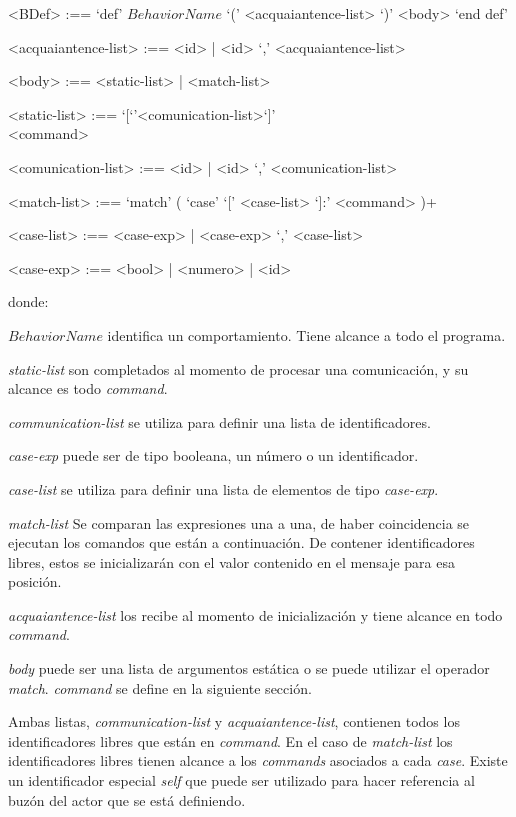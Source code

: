 \begin{grammar}
<BDef> :== `def' $BehaviorName$ `(' <acquaiantence-list> `)' <body> `end def'

<acquaiantence-list> :== <id> | <id> `,' <acquaiantence-list> 

<body> :== <static-list> | <match-list>

<static-list> :== `[`'<comunication-list>`]' \\ <command>

<comunication-list> :== <id> | <id> `,' <comunication-list>

<match-list> :==  `match' ( `case' `[' <case-list> `]:' <command> )+  

<case-list> :== <case-exp> | <case-exp> `,' <case-list> 

<case-exp> :== <bool> | <numero> | <id>  
\end{grammar}
donde: 
\begin{description}
 \item $BehaviorName$ identifica un comportamiento. Tiene alcance a todo el programa. 
 \item \textit{static-list} son completados al momento de procesar una comunicación, y su alcance es todo \textit{command}. 
 \item \textit{communication-list} se utiliza para definir una lista de identificadores.
 \item \textit{case-exp} puede ser de tipo booleana, un número o un identificador. 
 \item \textit{case-list} se utiliza para definir una lista de elementos de tipo \textit{case-exp}.
 \item \textit{match-list} Se comparan las expresiones una a una, de haber coincidencia se ejecutan los comandos que están a continuación. De contener identificadores libres, estos se inicializarán con el valor contenido en el mensaje para esa posición.
 \item \textit{acquaiantence-list} los recibe al momento de inicialización y tiene alcance en todo \textit{command}.
 \item \textit{body} puede ser una lista de argumentos estática o se puede utilizar el operador \textit{match}. \textit{command} se define en la siguiente sección.
\end{description}

Ambas listas, \textit{communication-list} y \textit{acquaiantence-list}, contienen todos los identificadores libres que están en \textit{command}. En el caso de \textit{match-list} los identificadores libres tienen alcance a los \textit{commands} asociados a cada \textit{case}. Existe un identificador especial \textit{self} que puede ser utilizado para hacer referencia al buzón del actor que se está definiendo. 


